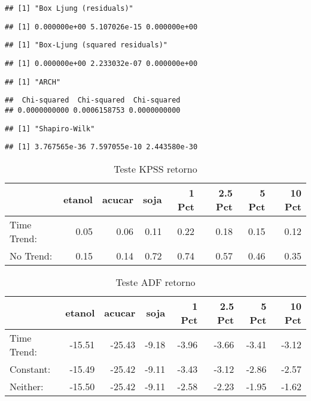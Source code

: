 \documentclass[]{article}
\begin{document}
\begin{verbatim}
## [1] "Box Ljung (residuals)"
\end{verbatim}

\begin{verbatim}
## [1] 0.000000e+00 5.107026e-15 0.000000e+00
\end{verbatim}

\begin{verbatim}
## [1] "Box-Ljung (squared residuals)"
\end{verbatim}

\begin{verbatim}
## [1] 0.000000e+00 2.233032e-07 0.000000e+00
\end{verbatim}

\begin{verbatim}
## [1] "ARCH"
\end{verbatim}

\begin{verbatim}
##  Chi-squared  Chi-squared  Chi-squared 
## 0.0000000000 0.0006158753 0.0000000000
\end{verbatim}

\begin{verbatim}
## [1] "Shapiro-Wilk"
\end{verbatim}

\begin{verbatim}
## [1] 3.767565e-36 7.597055e-10 2.443580e-30
\end{verbatim}

\begin{longtable}[t]{lrrrrrrr}
\caption{\label{tab:ADF e KPSS}Teste KPSS retorno}\\
\toprule
  & etanol & acucar & soja & 1 Pct & 2.5 Pct & 5 Pct & 10 Pct\\
\midrule
Time Trend: & 0.05 & 0.06 & 0.11 & 0.22 & 0.18 & 0.15 & 0.12\\
No Trend: & 0.15 & 0.14 & 0.72 & 0.74 & 0.57 & 0.46 & 0.35\\
\bottomrule
\end{longtable}

\begin{longtable}[t]{lrrrrrrr}
\caption{\label{tab:ADF e KPSS}Teste ADF retorno}\\
\toprule
  & etanol & acucar & soja & 1 Pct & 2.5 Pct & 5 Pct & 10 Pct\\
\midrule
Time Trend: & -15.51 & -25.43 & -9.18 & -3.96 & -3.66 & -3.41 & -3.12\\
Constant: & -15.49 & -25.42 & -9.11 & -3.43 & -3.12 & -2.86 & -2.57\\
Neither: & -15.50 & -25.42 & -9.11 & -2.58 & -2.23 & -1.95 & -1.62\\
\bottomrule
\end{longtable}
\end{document}
